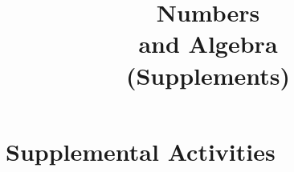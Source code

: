 \documentclass[justified,openany,nofonts]{tufte-book}
\title{Numbers \\ and Algebra \\ (Supplements)}
\author{\teachingnotes}
\renewcommand{\theenumi}{$(\mathrm{\arabic{enumi}})$}
\renewcommand{\labelenumi}{\theenumi}
\begin{document}
\def\document#1{} %
\def\clarification#1{}  %

\maketitle

%

\setcounter{tocdepth}{1}
\tableofcontents

\setcounter{secnumdepth}{2} %


%

\appendix

\renewcommand{\theenumi}{$(\mathrm{\alph{enumi}})$}
\renewcommand{\labelenumi}{\theenumi}
\chapter{Supplemental Activities}





\setcounter{section}{19}
%

%


\setcounter{section}{49}


%
%
%
%
%
%
%
%
\end{document}
